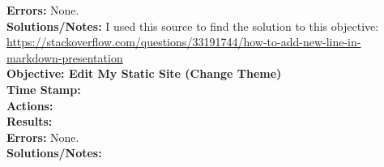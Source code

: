\documentclass{article}
\begin{document}
\begin{FlushLeft}
\textbf{Errors:} None.\\
\textbf{Solutions/Notes:} I used this source to find the solution to this objective: \url{https://stackoverflow.com/questions/33191744/how-to-add-new-line-in-markdown-presentation}\\
\vspace{5mm}
\textbf{Objective: Edit My Static Site (Change Theme)}\\
\textbf{Time Stamp:}\\
\textbf{Actions:} \\
\textbf{Results:} \\
\textbf{Errors:} None.\\
\textbf{Solutions/Notes:}\\
\vspace{5mm}

\pagebreak


\end{FlushLeft}
\end{document}
